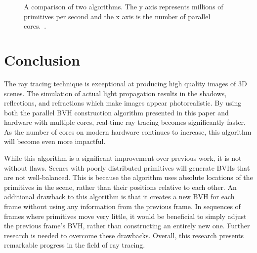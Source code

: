 \documentclass{sig-alternate}
\begin{document}

\begin{figure}
\centering
{}
\caption{A comparison of two algorithms. The y axis represents millions of primitives per second and the x axis is the number of parallel cores.~\cite{Karras:2012}.}
\label{fig:RadixCores}
\end{figure}

\section{Conclusion}
\label{sec:conclusion}

The ray tracing technique is exceptional at producing high quality images of 3D scenes. The simulation of actual light propagation results in the shadows, reflections, and refractions which make images appear photorealistic. By using both the parallel BVH construction algorithm presented in this paper and hardware with multiple cores, real-time ray tracing becomes significantly faster. As the number of cores on modern hardware continues to increase, this algorithm will become even more impactful.

While this algorithm is a significant improvement over previous work, it is not without flaws. Scenes with poorly distributed primitives will generate BVHs that are not well-balanced. This is because the algorithm uses absolute locations of the primitives in the scene, rather than their positions relative to each other. An additional drawback to this algorithm is that it creates a new BVH for each frame without using any information from the previous frame. In sequences of frames where primitives move very little, it would be beneficial to simply adjust the previous frame's BVH, rather than constructing an entirely new one. Further research is needed to overcome these drawbacks. Overall, this research presents remarkable progress in the field of ray tracing.

\end{document}
